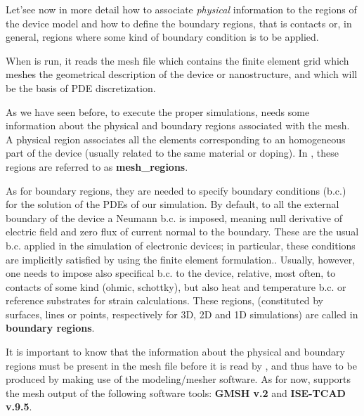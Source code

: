 \label{overview_boundaries}

Let'see  now  in  more  detail how  to  associate  \textit{physical}  information to  the  regions  of  the  device  model and  how  to  define  the  boundary  regions,  that  is  contacts or, in general,  regions  where  some  kind  of  boundary  condition is  to be  applied.

When \TiberCAD{}  is  run,  it  reads  the  mesh  file which  contains  the finite element  grid  which meshes the  geometrical description of  the  device or  nanostructure,  and  which will be  the  basis of  PDE  discretization.


As we  have  seen  before, to  execute the  proper  simulations, \TiberCAD{} needs  some  information about  the   physical and boundary regions  associated with the  mesh.
A physical region associates all  the  elements  corresponding to  an  homogeneous  part  of  the  device (usually  related to  the  same  material or  doping).   In  \TiberCAD{}, these regions  are  referred to as \textbf{mesh\_regions}.
\

As for boundary regions, they  are  needed to  specify   boundary  conditions (b.c.)  for  the  solution of  the PDEs  of  our  simulation.
By  default,  to all   the  external boundary  of  the  device  a  Neumann b.c. is  imposed,   meaning  null  derivative  of  electric  field  and  zero  flux  of  current  normal to  the  boundary.  These are  the  usual  b.c.  applied in  the   simulation  of  electronic  devices;  in   particular, these  conditions are  implicitly  satisfied by using  the  finite  element  formulation..
%
Usually,  however, one  needs  to  impose   also   specifical  b.c.  to  the  device,  relative,  most  often, to  contacts of  some  kind (ohmic, schottky),  but  also   heat and  temperature b.c.  or  reference substrates  for  strain  calculations.
These  regions,  (constituted by  surfaces, lines or  points,  respectively  for  3D,  2D  and  1D  simulations) are  called in  \TiberCAD{}  \textbf{boundary regions}.


It  is  important to  know  that  the  information about  the   physical and boundary regions  must  be  present in  the  mesh  file  before it  is  read  by  \TiberCAD{},  and  thus  have  to  be  produced by  making  use of  the  modeling/mesher  software.
As  for  now,  \TiberCAD{} supports  the  mesh  output  of  the  following   software tools:  \textbf{GMSH v.2} and  \textbf{ISE-TCAD  v.9.5}.


